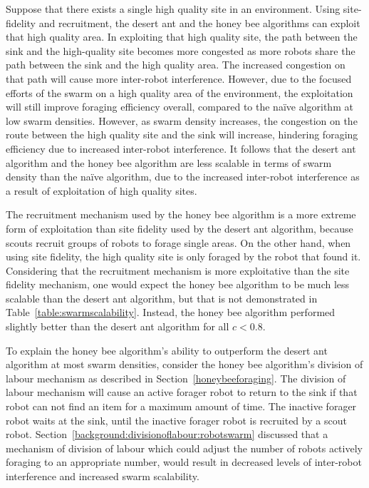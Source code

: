 \documentclass[preprint,12pt]{elsarticle}
\begin{document}
Suppose that there exists a single high quality site in an environment. Using site-fidelity and recruitment, the desert ant and the honey bee algorithms can exploit that high quality area. In exploiting that high quality site, the path between the sink and the high-quality site becomes more congested as more robots share the path between the sink and the high quality area. The increased congestion on that path will cause more inter-robot interference. However, due to the focused efforts of the swarm on a high quality area of the environment, the exploitation will still improve foraging efficiency overall, compared to the na\"ive algorithm at low swarm densities. However, as swarm density increases, the congestion on the route between the high quality site and the sink will increase, hindering foraging efficiency due to increased inter-robot interference. It follows that the desert ant algorithm and the honey bee algorithm are less scalable in terms of swarm density than the na\"ive algorithm, due to the increased inter-robot interference as a result of exploitation of high quality sites.

The recruitment mechanism used by the honey bee algorithm is a more extreme form of exploitation than site fidelity used by the desert ant algorithm, because scouts recruit groups of robots to forage single areas. On the other hand, when using site fidelity, the high quality site is only foraged by the robot that found it. Considering that the recruitment mechanism is more exploitative than the site fidelity mechanism, one would expect the honey bee algorithm to be much less scalable than the desert ant algorithm, but that is not demonstrated in Table~\ref{table:swarmscalability}. Instead, the honey bee algorithm performed slightly better than the desert ant algorithm for all $c < 0.8$.

To explain the honey bee algorithm's ability to outperform the desert ant algorithm at most swarm densities, consider the honey bee algorithm's division of labour mechanism as described in Section~\ref{honeybeeforaging}. The division of labour mechanism will cause an active forager robot to return to the sink if that robot can not find an item for a maximum amount of time. The inactive forager robot waits at the sink, until the inactive forager robot is recruited by a scout robot. Section~\ref{background:divisionoflabour:robotswarm} discussed that a mechanism of division of labour which could adjust the number of robots actively foraging to an appropriate number, would result in decreased levels of inter-robot interference and increased swarm scalability.
\end{document}

